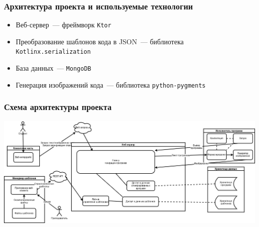 \documentclass[14pt,aspectratio=169,hyperref={pdftex,unicode},xcolor=dvipsnames]{beamer}
\begin{document}



\begin{frame}
    \frametitle{Архитектура проекта и используемые технологии}
    \begin{itemize}
        \item Веб-сервер~--- фреймворк \texttt{Ktor}
        \item Преобразование шаблонов кода в JSON~--- библиотека \texttt{Kotlinx.serialization}
        \item База данных~--- \texttt{MongoDB}
        \item Генерация изображений кода~--- библиотека \texttt{python-pygments}
    \end{itemize}
\end{frame}

\begin{frame}
    \frametitle{Схема архитектуры проекта}
    \begin{center}
        \includegraphics[width=\textwidth]{images/architecture-landscape.drawio.png}
    \end{center}
\end{frame}
\end{document}
